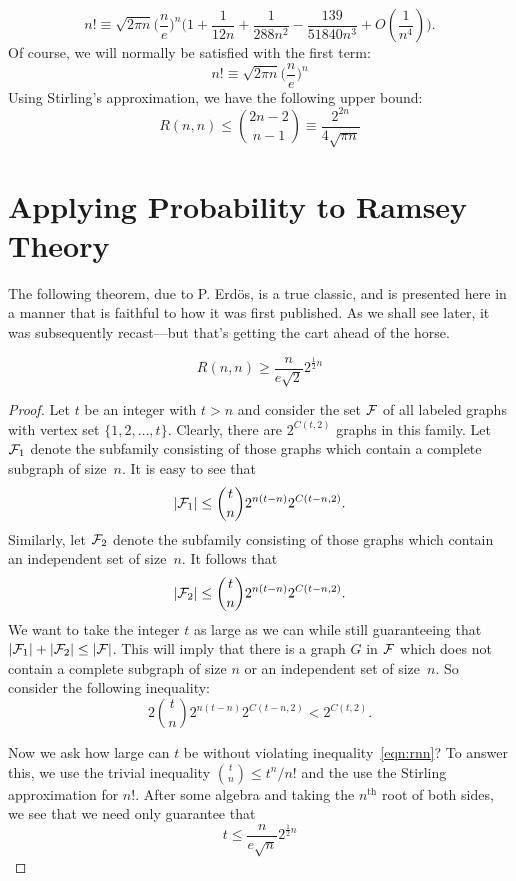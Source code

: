 \[
n!\equiv \sqrt{2\pi n} \bigl( \frac{n}{e}\bigr)^n\bigl(1+
  \frac{1}{12n}+\frac{1}{288n^2}-\frac{139}{51840n^3} +O(\frac{1}{n^4})\bigr).
\]
Of course, we will normally be satisfied with the
first term:
\[
n!\equiv \sqrt{2\pi n} \bigl( \frac{n}{e}\bigr)^n
\]
Using Stirling's approximation, we have the following
upper bound:
\[
R(n,n) \le \binom{2n-2}{n-1} \equiv \frac{2^{2n}}{4\sqrt{\pi n}} 
\]


\section{Applying Probability to Ramsey Theory}\label{s:ramsey:probability}

The following theorem, due to P. Erd\"os, is a true classic,
and is presented here in a manner that is faithful to how it
was first published.  As we shall see later, it was subsequently
recast---but that's getting the cart ahead of the horse.

\begin{theorem}\label{thm:rnn}
\[
R(n,n) \ge \frac{n}{e\sqrt2} 2^{\frac{1}{2}n}
\]
\end{theorem}

\begin{proof}
Let $t$ be an integer with $t>n$ and consider the set $\mathcal{F}$ of
all labeled graphs with vertex set $\{1,2,\dots,t\}$.  Clearly,
there are $2^{C(t,2)}$ graphs in this family.  Let $\mathcal{F}_1$ denote the
subfamily consisting of those graphs which contain a complete subgraph of
size~$n$.  It is easy to see that
\[
|\mathcal{F}_1|\le \binom{t}{n}2^{n(t-n)}2^{C(t-n,2)}.
\]
Similarly, let $\mathcal{F}_2$ denote the subfamily consisting of those graphs which 
contain an independent set of size~$n$.  It follows that
\[
|\mathcal{F}_2|\le \binom{t}{n}2^{n(t-n)}2^{C(t-n,2)}.
\]
We want to take the integer $t$ as large as we can while still guaranteeing that
$|\mathcal{F}_1|+|\mathcal{F}_2|\le |\mathcal{F}|$.  This will imply that there is a graph
$G$ in $\mathcal{F}$ which does not contain a complete subgraph of size $n$ or
an independent set of size~$n$.   So consider the following inequality:
\begin{equation}\label{eqn:rnn}
2\binom{t}{n}2^{n(t-n)}2^{C(t-n,2)}<2^{C(t,2)}.
\end{equation}

Now we ask how large can $t$ be without violating inequality~\ref{eqn:rnn}?
To answer this, we use the trivial inequality $\binom{t}{n}\le t^n/n!$ and the
use the Stirling approximation for $n!$.  After some algebra and taking the
$n^{\text{th}}$ root of both sides, we see 
that we need only guarantee that 
\[
t\le \frac{n}{e\sqrt{n}}2^{\frac{1}{2}n} 
\]
\end{proof}

